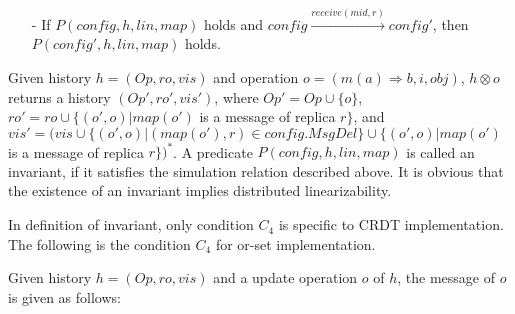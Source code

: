 {\begin{itemize}
\item[-] If $P(\mathit{config},h,\mathit{lin},\mathit{map})$ holds and $\mathit{config} {\xrightarrow{\mathit{receive}(\mathit{mid},r)}} \mathit{config}'$, then $P(\mathit{config}',h,\mathit{lin},\mathit{map})$ holds.
\end{itemize}

Given history $h = (\mathit{Op},\mathit{ro},\mathit{vis})$ and operation $o = (m(a) \Rightarrow b,i,\mathit{obj})$, $h \otimes o$ returns a history $(\mathit{Op}',\mathit{ro}',\mathit{vis}')$, where $\mathit{Op}' = \mathit{Op} \cup \{ o \}$, $\mathit{ro}' = \mathit{ro} \cup \{ (o',o) \vert \mathit{map}(o')$ is a message of replica $r \}$, and $\mathit{vis}' = (\mathit{vis} \cup \{ (o',o) \vert (\mathit{map}(o'),r) \in \mathit{config}.\mathit{MsgDel} \} \cup \{ (o',o) \vert \mathit{map}(o')$ is a message of replica $r \})^*$. A predicate $P(\mathit{config},h,\mathit{lin},\mathit{map})$ is called an invariant, if it satisfies the simulation relation described above. It is obvious that the existence of an invariant implies distributed linearizability.



In definition of invariant, only condition $C_4$ is specific to CRDT implementation. The following is the condition $C_4$ for or-set implementation.

\begin{example}
\label{example:c4 for or-set implementation}

Given history $h = (\mathit{Op},\mathit{ro},\mathit{vis})$ and a update operation $o$ of $h$, the message of $o$ is given as follows:


\end{example}}
